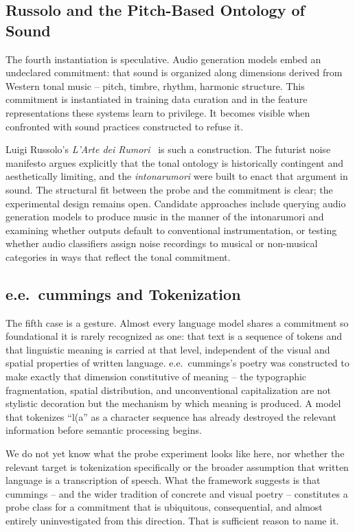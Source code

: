 \documentclass[
  twocolumn,
]{ceurart}
\begin{document}
\subsection{Russolo and the Pitch-Based Ontology of Sound}

The fourth instantiation is speculative. Audio generation models embed an undeclared commitment: that sound is organized along dimensions derived from Western tonal music -- pitch, timbre, rhythm, harmonic structure. This commitment is instantiated in training data curation and in the feature representations these systems learn to privilege. It becomes visible when confronted with sound practices constructed to refuse it.

Luigi Russolo's \emph{L'Arte dei Rumori}~\cite{Russolo1913} is such a construction. The futurist noise manifesto argues explicitly that the tonal ontology is historically contingent and aesthetically limiting, and the \emph{intonarumori} were built to enact that argument in sound. The structural fit between the probe and the commitment is clear; the experimental design remains open. Candidate approaches include querying audio generation models to produce music in the manner of the intonarumori and examining whether outputs default to conventional instrumentation, or testing whether audio classifiers assign noise recordings to musical or non-musical categories in ways that reflect the tonal commitment.

\subsection{e.e.\ cummings and Tokenization}

The fifth case is a gesture. Almost every language model shares a commitment so foundational it is rarely recognized as one: that text is a sequence of tokens and that linguistic meaning is carried at that level, independent of the visual and spatial properties of written language. e.e.\ cummings's poetry was constructed to make exactly that dimension constitutive of meaning -- the typographic fragmentation, spatial distribution, and unconventional capitalization are not stylistic decoration but the mechanism by which meaning is produced. A model that tokenizes ``l(a'' as a character sequence has already destroyed the relevant information before semantic processing begins.

We do not yet know what the probe experiment looks like here, nor whether the relevant target is tokenization specifically or the broader assumption that written language is a transcription of speech. What the framework suggests is that cummings -- and the wider tradition of concrete and visual poetry -- constitutes a probe class for a commitment that is ubiquitous, consequential, and almost entirely uninvestigated from this direction. That is sufficient reason to name it.
\end{document}
